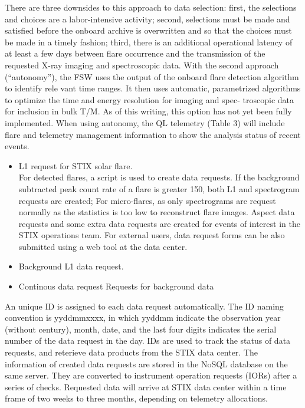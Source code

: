 \documentclass[referee]{aa} %
\begin{document}
There are three downsides to this approach to data selection:
first, the selections and choices are a labor-intensive activity;
second, selections must be made and satisfied before the onboard
archive is overwritten and so that the choices must be made in a 
timely fashion; third, there is an additional operational latency of
at least a few days between flare occurrence and the transmission
of the requested X-ray imaging and spectroscopic data.
With the second approach (“autonomy”), the FSW uses the
output of the onboard flare detection algorithm to identify rele
vant time ranges. It then uses automatic, parametrized algorithms
to optimize the time and energy resolution for imaging and spec-
troscopic data for inclusion in bulk T/M. As of this writing, this
option has not yet been fully implemented. When using autonomy,
the QL telemetry (Table 3) will include flare and telemetry
management information to show the analysis status of recent
events.

\begin{itemize}
\item L1 request for STIX solar flare.\\
For detected flares,  a script is used to create data requests.
If the background subtracted peak count rate of a flare is greater 150,
both L1 and spectrogram requests are created;  For micro-flares, as only
spectrograms are request normally as the statistics is too
low to reconstruct flare images.  Aspect data requests
and some extra data requests are created for events of interest in the
STIX operations team.
For external users, data request forms can be also submitted using a web tool
at the data center.
\item Background L1 data request.
\item Continous data request Requests for background data
\end{itemize}

An unique ID is assigned to each data request automatically.
The ID naming convention is yyddmmxxxx, in which yyddmm indicate the observation year (without century), month, date,
and the last four digits indicates the serial number of the data request in the day.
IDs are used to track the status of data requests, and reterieve data products from the
STIX data center.
The information of created data requests are stored in the NoSQL database on the same server.
They are converted to instrument operation requests (IORs) after a series of checks.
Requested data will arrive at STIX data center within a time frame of two weeks to three months, depending on
telemetry allocations.
\end{document}
